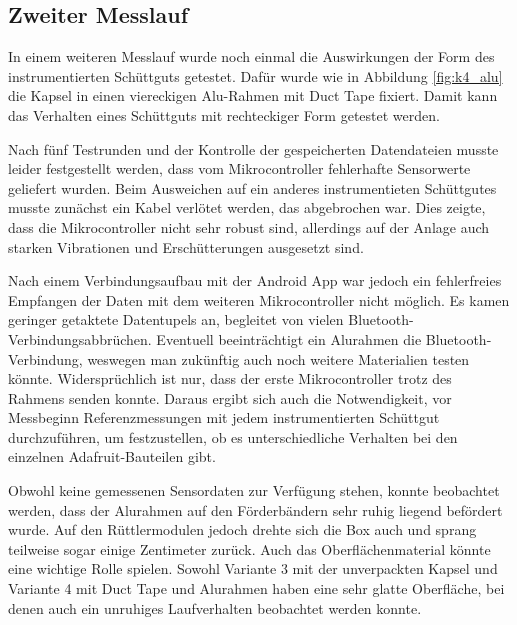 
\subsection{Zweiter Messlauf}

In einem weiteren Messlauf wurde noch einmal die Auswirkungen der Form des instrumentierten Schüttguts getestet. Dafür wurde wie in Abbildung \ref{fig:k4_alu} die Kapsel in einen viereckigen Alu-Rahmen  mit Duct Tape fixiert. Damit kann das Verhalten eines Schüttguts mit rechteckiger Form getestet werden. 


Nach fünf Testrunden und der Kontrolle der gespeicherten Datendateien musste leider festgestellt werden, dass vom Mikrocontroller fehlerhafte Sensorwerte geliefert wurden. Beim Ausweichen auf ein anderes instrumentieten Schüttgutes musste zunächst ein Kabel verlötet werden, das abgebrochen war. Dies zeigte, dass die Mikrocontroller nicht sehr robust sind, allerdings auf der Anlage auch starken Vibrationen und Erschütterungen ausgesetzt sind.

Nach einem Verbindungsaufbau mit der Android App war jedoch ein fehlerfreies Empfangen der Daten mit dem weiteren Mikrocontroller nicht möglich. Es kamen geringer getaktete Datentupels an, begleitet von vielen Bluetooth-Verbindungsabbrüchen. Eventuell beeinträchtigt ein Alurahmen die Bluetooth-Verbindung, weswegen man zukünftig auch noch weitere Materialien testen könnte. Widersprüchlich ist nur, dass der erste Mikrocontroller trotz des Rahmens senden konnte. Daraus ergibt sich auch die Notwendigkeit, vor Messbeginn Referenzmessungen mit jedem instrumentierten Schüttgut durchzuführen, um festzustellen, ob es unterschiedliche Verhalten bei den einzelnen Adafruit-Bauteilen gibt.

Obwohl keine gemessenen Sensordaten zur Verfügung stehen, konnte beobachtet werden, dass der Alurahmen auf den Förderbändern sehr ruhig liegend befördert wurde. Auf den Rüttlermodulen jedoch drehte sich die Box auch und sprang teilweise sogar einige Zentimeter zurück. Auch das Oberflächenmaterial könnte eine wichtige Rolle spielen. Sowohl Variante 3 mit der unverpackten Kapsel und Variante 4 mit Duct Tape und Alurahmen haben eine sehr glatte Oberfläche, bei denen auch ein unruhiges Laufverhalten beobachtet werden konnte.
